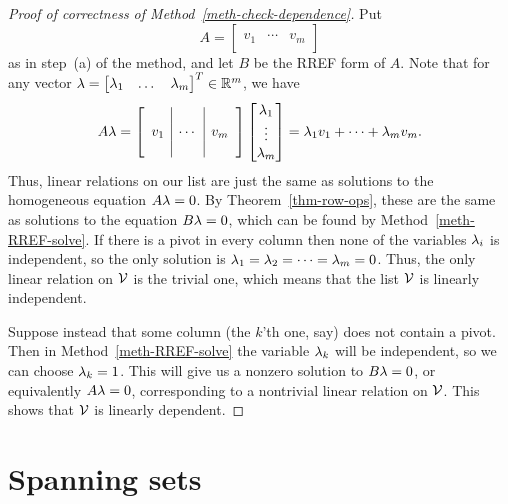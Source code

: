 \documentclass[reqno]{amsart}
\theoremstyle{definition}
\begin{document}
\begin{proof}[Proof of correctness of Method~\ref{meth-check-dependence}]
 Put
 \[ A = \left[\begin{array}{c|c|c}
              && \\
              v_1 & \cdots & v_m \\
              &&
        \end{array}\right]
 \]
 as in step~(a) of the method, and let $B$ be the RREF form of $A$.
 Note that for any vector
 $\lambda=\left[\begin{matrix} \lambda_1 & \dotsc & \lambda_m\end{matrix}\right]^T\in{\mathbb{R}}^m$, we have
 \[ A\lambda =
     \left[\begin{array}{c|c|c}
              && \\
              v_1 & \cdots & v_m \\
              &&
     \end{array}\right]
     \left[\begin{matrix} \lambda_1 \\ \vdots \\ \lambda_m \end{matrix}\right] =
     \lambda_1v_1 + \dotsb + \lambda_mv_m.
 \]
 Thus, linear relations on our list are just the same as solutions to
 the homogeneous equation $A\lambda=0$.  By Theorem~\ref{thm-row-ops},
 these are the same as solutions to the equation $B\lambda=0$, which can
 be found by Method~\ref{meth-RREF-solve}.  If there is a pivot in
 every column then none of the variables $\lambda_i$ is independent, so
 the only solution is $\lambda_1=\lambda_2=\dotsb=\lambda_m=0$.  Thus, the only
 linear relation on $\mathcal{V}$ is the trivial one, which means that the
 list $\mathcal{V}$ is linearly independent.

 Suppose instead that some column (the $k$'th one, say) does not
 contain a pivot.  Then in Method~\ref{meth-RREF-solve} the variable
 $\lambda_k$ will be independent, so we can choose $\lambda_k=1$.  This will
 give us a nonzero solution to $B\lambda=0$, or equivalently $A\lambda=0$,
 corresponding to a nontrivial linear relation on $\mathcal{V}$.  This shows
 that $\mathcal{V}$ is linearly dependent.
\end{proof}

\section{Spanning sets}
\label{sec-spanning}
\end{document}
